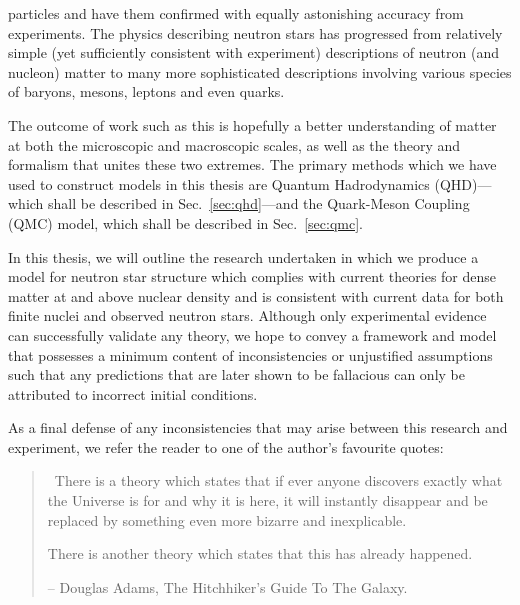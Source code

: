 \documentclass[11pt,a4paper,twoside]{carrollthesis}
\newcommand{\emdash}{\hspace{1pt}---\hspace{1pt}}
\begin{document}
particles and have them confirmed with equally astonishing accuracy
from experiments. The physics describing neutron stars has progressed
from relatively simple (yet sufficiently consistent with experiment)
descriptions of neutron (and nucleon) matter to many more
sophisticated descriptions involving various species of baryons,
mesons, leptons and even quarks.\par
%
The outcome of work such as this is hopefully a better understanding
of matter at both the microscopic and macroscopic scales, as well as
the theory and formalism that unites these two extremes. The primary
methods which we have used to construct models in this thesis are
Quantum Hadrodynamics (QHD)\emdash which shall be described in
Sec.~\ref{sec:qhd}\emdash and the Quark-Meson Coupling
(QMC) model, which shall be described in Sec.~\ref{sec:qmc}.\par
%
In this thesis, we will outline the research undertaken in which we
produce a model for neutron star structure which complies with current
theories for dense matter at and above nuclear density and is
consistent with current data for both finite nuclei and observed
neutron stars. Although only experimental evidence can successfully
validate any theory, we hope to convey a framework and model that
possesses a minimum content of inconsistencies or unjustified
assumptions such that any predictions that are later shown to be
fallacious can only be attributed to incorrect initial conditions.\par
%
As a final defense of any inconsistencies that may arise between this
research and experiment, we refer the reader to one of the author's
favourite quotes:\par
%
\vspace{0.2cm}
%
\begin{quotation}
{\raisebox{-2mm}{\Huge ``}\ 
There is a theory which states that if ever
anyone discovers exactly what the Universe is for and
why it is here, it will instantly disappear and be replaced by
something even more bizarre and inexplicable.\par \phantom{abc}}
\vspace{0.4mm}
{There is another theory which states that this 
has already happened.\ \raisebox{-2mm}{\Huge ''}}
\begin{flushright}
-- Douglas Adams, The Hitchhiker's Guide To The Galaxy.
\end{flushright}
\end{quotation}
%
\end{document}

